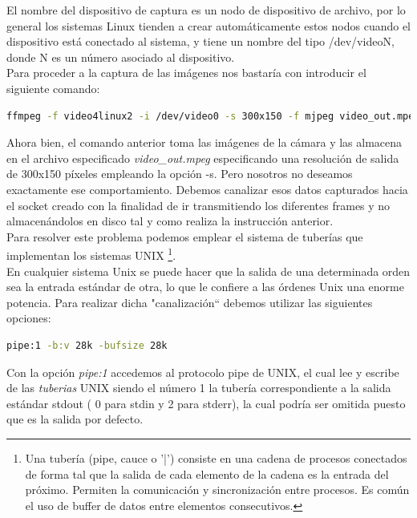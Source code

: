 El nombre del dispositivo de captura es un nodo de dispositivo de archivo, por lo general los sistemas Linux tienden a crear automáticamente estos nodos cuando el dispositivo
está conectado al sistema, y ​​tiene un nombre del tipo /dev/videoN, donde N es un número asociado al dispositivo.\\ 


Para proceder a la captura de las imágenes nos bastaría con introducir el siguiente comando:\\

\begin{lstlisting}[language=bash]
  ffmpeg -f video4linux2 -i /dev/video0 -s 300x150 -f mjpeg video_out.mpeg
\end{lstlisting}

Ahora bien, el comando anterior toma las imágenes de la cámara y las almacena en el archivo especificado \emph{ video\_out.mpeg} especificando una resolución de salida de 300x150 píxeles
empleando la opción -s. Pero nosotros no deseamos exactamente ese comportamiento. Debemos canalizar esos datos capturados hacia el socket creado con la finalidad de ir transmitiendo los 
diferentes frames y no almacenándolos en disco tal y como realiza la instrucción anterior.\\


Para resolver este problema podemos emplear el sistema de tuberías que implementan los sistemas UNIX \footnote{ Una tubería (pipe, cauce o '|') consiste en una cadena de 
procesos conectados de forma tal que la salida de cada elemento de la cadena es la entrada del próximo. Permiten la comunicación y sincronización entre procesos. Es común el uso de
buffer de datos entre elementos consecutivos. }.\\

En cualquier sistema Unix se puede hacer que la salida de una determinada orden sea la entrada estándar de otra, lo que le confiere a las órdenes Unix una enorme potencia.
Para realizar dicha "canalización`` debemos utilizar las siguientes opciones:\\

\begin{lstlisting}[language=bash]
  pipe:1 -b:v 28k -bufsize 28k
\end{lstlisting}


Con la opción \emph{pipe:1} accedemos al protocolo pipe de UNIX, el cual lee y escribe de las \emph{tuberias} UNIX siendo el número 1 la tubería correspondiente a la salida estándar 
stdout ( 0 para stdin y 2 para stderr), la cual podría ser omitida puesto que es la salida por defecto.\\


